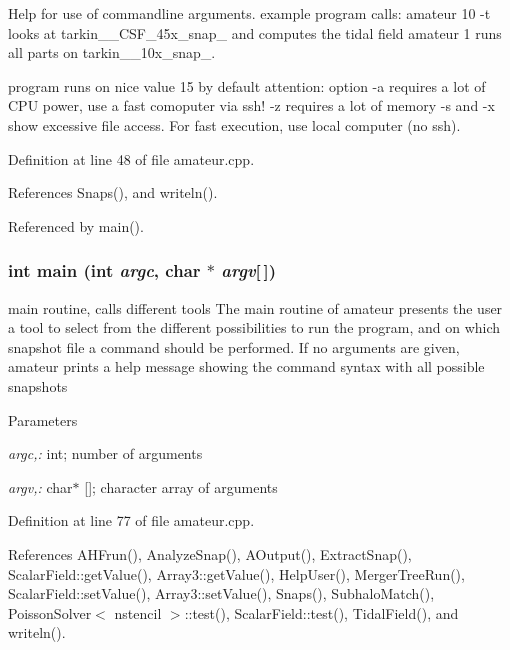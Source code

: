 Help for use of commandline arguments. example program calls: amateur 10 -\/t looks at tarkin\_\_\-CSF\_\-45x\_\-snap\_ and computes the tidal field amateur 1 runs all parts on tarkin\_\_\-10x\_\-snap\_. 

program runs on nice value 15 by default attention: option -\/a requires a lot of CPU power, use a fast comoputer via ssh! -\/z requires a lot of memory -\/s and -\/x show excessive file access. For fast execution, use local computer (no ssh). 

Definition at line 48 of file amateur.cpp.



References Snaps(), and writeln().



Referenced by main().

\subsubsection[{main}]{\setlength{\rightskip}{0pt plus 5cm}int main (int {\em argc}, \/  char $\ast$ {\em argv}\mbox{[}$\,$\mbox{]})}\label{amateur_8cpp_a0ddf1224851353fc92bfbff6f499fa97}


main routine, calls different tools The main routine of amateur presents the user a tool to select from the different possibilities to run the program, and on which snapshot file a command should be performed. If no arguments are given, amateur prints a help message showing the command syntax with all possible snapshots 


\begin{DoxyParams}{Parameters}
\item[{\em argc,:}]int; number of arguments \item[{\em argv,:}]char$\ast$ \mbox{[}\mbox{]}; character array of arguments \end{DoxyParams}


Definition at line 77 of file amateur.cpp.



References AHFrun(), AnalyzeSnap(), AOutput(), ExtractSnap(), ScalarField::getValue(), Array3::getValue(), HelpUser(), MergerTreeRun(), ScalarField::setValue(), Array3::setValue(), Snaps(), SubhaloMatch(), PoissonSolver$<$ nstencil $>$::test(), ScalarField::test(), TidalField(), and writeln().

